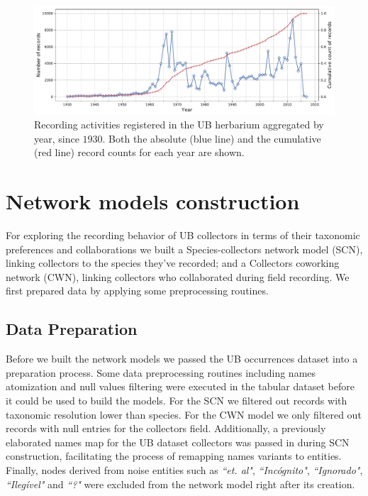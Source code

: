   \begin{figure}[h!]
  	\centering
    \includegraphics[width=\linewidth]{figures/casestudy_ub/ub_records_timeseries.pdf}
    \caption{Recording activities registered in the UB herbarium aggregated by year, since $1930$. Both the absolute (blue line) and the cumulative (red line) record counts for each year are shown.}
    \label{fig:ub_records_timeseries}
  \end{figure}









\section{Network models construction}



For exploring the recording behavior of UB collectors in terms of their taxonomic preferences and collaborations we built a Species-collectors network model (SCN), linking collectors to the species they've recorded; and a Collectors coworking network (CWN), linking collectors who collaborated during field recording.
We first prepared data by applying some preprocessing routines.

\subsection{Data Preparation} \label{section:ub_data_preparation}
Before we built the network models we passed the UB occurrences dataset into a preparation process.
Some data preprocessing routines including names atomization and null values filtering were executed in the tabular dataset before it could be used to build the models. 
For the SCN we filtered out records with taxonomic resolution lower than species.
For the CWN model we only filtered out records with null entries for the collectors field.
Additionally, a previously elaborated names map for the UB dataset collectors was passed in during SCN construction, facilitating the process of remapping names variants to entities. 
Finally, nodes derived from noise entities such as \textit{``et. al"}, \textit{``Incógnito"}, \textit{``Ignorado"}, \textit{``Ilegível"} and \textit{``?"} were excluded from the network model right after its creation.

